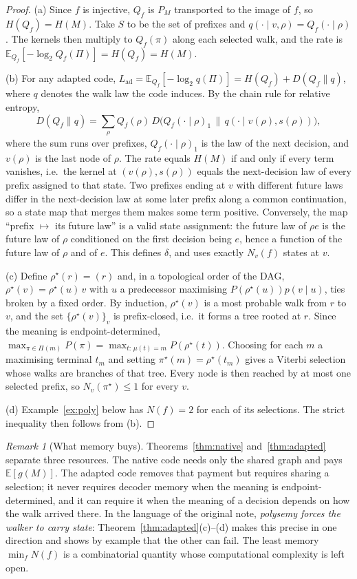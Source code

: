 \documentclass[11pt]{article}
\theoremstyle{definition}
\theoremstyle{remark}
\newtheorem{remark}{Remark}
\newcommand{\Pset}{\Pi}
\newcommand{\E}{\mathbb{E}}
\newcommand{\D}{D}
\begin{document}
\begin{proof}
(a) Since $f$ is injective, $Q_f$ is $P_M$ transported to the image of $f$, so $H(Q_f)=H(M)$. Take $S$ to be the set of prefixes and $q(\cdot\mid v,\rho)=Q_f(\cdot\mid\rho)$. The kernels then multiply to $Q_f(\pi)$ along each selected walk, and the rate is $\E_{Q_f}[-\log_2 Q_f(\Pi)]=H(Q_f)=H(M)$.

(b) For any adapted code, $L_{\mathrm{ad}}=\E_{Q_f}[-\log_2 q(\Pi)]=H(Q_f)+\D(Q_f\|q)$, where $q$ denotes the walk law the code induces. By the chain rule for relative entropy,
\[
\D(Q_f\|q)=\sum_{\rho}Q_f(\rho)\,\D\bigl(Q_f(\cdot\mid\rho)_1\,\big\|\,q(\cdot\mid v(\rho),s(\rho))\bigr),
\]
where the sum runs over prefixes, $Q_f(\cdot\mid\rho)_1$ is the law of the next decision, and $v(\rho)$ is the last node of $\rho$. The rate equals $H(M)$ if and only if every term vanishes, i.e.\ the kernel at $(v(\rho),s(\rho))$ equals the next-decision law of every prefix assigned to that state. Two prefixes ending at $v$ with different future laws differ in the next-decision law at some later prefix along a common continuation, so a state map that merges them makes some term positive. Conversely, the map ``prefix $\mapsto$ its future law'' is a valid state assignment: the future law of $\rho e$ is the future law of $\rho$ conditioned on the first decision being $e$, hence a function of the future law of $\rho$ and of $e$. This defines $\delta$, and uses exactly $N_v(f)$ states at $v$.

(c) Define $\rho^\star(r)=(r)$ and, in a topological order of the DAG, $\rho^\star(v)=\rho^\star(u)\,v$ with $u$ a predecessor maximising $P(\rho^\star(u))p(v\mid u)$, ties broken by a fixed order. By induction, $\rho^\star(v)$ is a most probable walk from $r$ to $v$, and the set $\{\rho^\star(v)\}_v$ is prefix-closed, i.e.\ it forms a tree rooted at $r$. Since the meaning is endpoint-determined, $\max_{\pi\in\Pset(m)}P(\pi)=\max_{t:\,\mu(t)=m}P(\rho^\star(t))$. Choosing for each $m$ a maximising terminal $t_m$ and setting $\pi^\star(m)=\rho^\star(t_m)$ gives a Viterbi selection whose walks are branches of that tree. Every node is then reached by at most one selected prefix, so $N_v(\pi^\star)\le1$ for every $v$.

(d) Example~\ref{ex:poly} below has $N(f)=2$ for each of its selections. The strict inequality then follows from (b).
\end{proof}

\begin{remark}[What memory buys]
Theorems~\ref{thm:native} and~\ref{thm:adapted} separate three resources. The native code needs only the shared graph and pays $\E[g(M)]$. The adapted code removes that payment but requires sharing a selection; it never requires decoder memory when the meaning is endpoint-determined, and it can require it when the meaning of a decision depends on how the walk arrived there. In the language of the original note, \emph{polysemy forces the walker to carry state}: Theorem~\ref{thm:adapted}(c)--(d) makes this precise in one direction and shows by example that the other can fail. The least memory $\min_fN(f)$ is a combinatorial quantity whose computational complexity is left open.
\end{remark}
\end{document}
